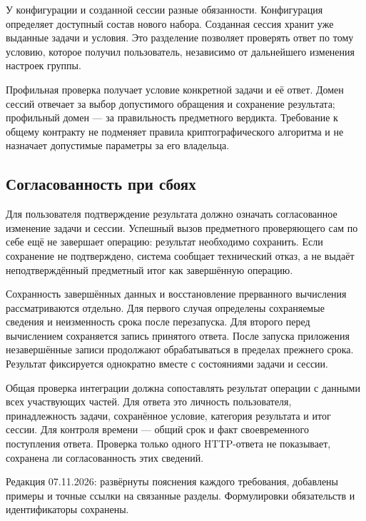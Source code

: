 \documentclass[12pt,a4paper]{article}
\begin{document}
У конфигурации и созданной сессии разные обязанности. Конфигурация определяет доступный состав нового набора. Созданная сессия хранит уже выданные задачи и условия. Это разделение позволяет проверять ответ по тому условию, которое получил пользователь, независимо от дальнейшего изменения настроек группы.

Профильная проверка получает условие конкретной задачи и её ответ. Домен сессий отвечает за выбор допустимого обращения и сохранение результата; профильный домен --- за правильность предметного вердикта. Требование к общему контракту не подменяет правила криптографического алгоритма и не назначает допустимые параметры за его владельца.

\subsection{Согласованность при сбоях}\label{ux441ux43eux433ux43bux430ux441ux43eux432ux430ux43dux43dux43eux441ux442ux44c-ux43fux440ux438-ux441ux431ux43eux44fux445}

\hypertarget{согласованность-при-сбоях}{}

Для пользователя подтверждение результата должно означать согласованное изменение задачи и сессии. Успешный вызов предметного проверяющего сам по себе ещё не завершает операцию: результат необходимо сохранить. Если сохранение не подтверждено, система сообщает технический отказ, а не выдаёт неподтверждённый предметный итог как завершённую операцию.

Сохранность завершённых данных и восстановление прерванного вычисления рассматриваются отдельно. Для первого случая определены сохраняемые сведения и неизменность срока после перезапуска. Для второго перед вычислением сохраняется запись принятого ответа. После запуска приложения незавершённые записи продолжают обрабатываться в пределах прежнего срока. Результат фиксируется однократно вместе с состояниями задачи и сессии.

Общая проверка интеграции должна сопоставлять результат операции с данными всех участвующих частей. Для ответа это личность пользователя, принадлежность задачи, сохранённое условие, категория результата и итог сессии. Для контроля времени --- общий срок и факт своевременного поступления ответа. Проверка только одного HTTP-ответа не показывает, сохранена ли согласованность этих сведений.

Редакция 07.11.2026: развёрнуты пояснения каждого требования, добавлены примеры и точные ссылки на связанные разделы. Формулировки обязательств и идентификаторы сохранены.
\end{document}
